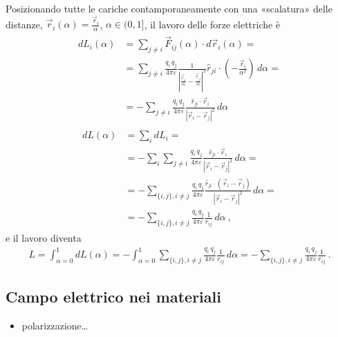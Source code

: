 \documentclass[letterpaper,10pt,italian]{jupyterBook}
\begin{document}
\sphinxAtStartPar
Posizionando tutte le cariche contamporaneamente con una «scalatura» delle distanze, \(\vec{r}_i(\alpha) = \frac{\vec{r}_i}{\alpha}\), \(\alpha \in (0, 1]\), il lavoro delle forze elettriche è
\begin{equation*}
\begin{split}\begin{aligned}
  dL_i(\alpha) & = \sum_{j \ne i} \vec{F}_{ij}(\alpha) \cdot d \vec{r}_i(\alpha) = \\
  & = \sum_{j \ne i} \frac{q_i \, q_j}{4 \pi \varepsilon}  \frac{1}{\left| \frac{\vec{r}_i}{\alpha} - \frac{\vec{r}_j}{\alpha}\right|^2} \hat{r}_{ji} \cdot \left(-\frac{\vec{r}_i}{\alpha^2}\right) \, d \alpha = \\
  & = - \sum_{j \ne i} \frac{q_i \, q_j}{4 \pi \varepsilon}  \frac{\hat{r}_{ji} \cdot\vec{r}_i}{\left| \vec{r}_i - \vec{r}_j\right|^2}  \, d \alpha
\end{aligned}\end{split}
\end{equation*}\begin{equation*}
\begin{split}\begin{aligned}
 dL(\alpha) & = \sum_i d L_i = \\
  & = - \sum_{i} \sum_{j \ne i} \frac{q_i \, q_j}{4 \pi \varepsilon}  \frac{\hat{r}_{ji} \cdot\vec{r}_i}{\left| \vec{r}_i - \vec{r}_j\right|^2}  \, d \alpha = \\
  & = - \sum_{\{i,j\}, i \ne j} \frac{q_i \, q_j}{4 \pi \varepsilon}  \frac{\hat{r}_{ji} \cdot \left( \vec{r}_i - \vec{r}_j \right)}{\left| \vec{r}_i - \vec{r}_j\right|^2}  \, d \alpha = \\
  & = - \sum_{\{i,j\}, i \ne j} \frac{q_i \, q_j}{4 \pi \varepsilon}  \frac{1}{r_{ij}}  \, d \alpha  \ ,
\end{aligned}\end{split}
\end{equation*}
\sphinxAtStartPar
e il lavoro diventa
\begin{equation*}
\begin{split}
 L = \int_{\alpha = 0}^{1} dL (\alpha) =  - \int_{\alpha=0}^{1} \sum_{\{i,j\}, i \ne j} \frac{q_i \, q_j}{4 \pi \varepsilon}  \frac{1}{r_{ij}}  \, d \alpha = - \sum_{\{i,j\}, i \ne j} \frac{q_i \, q_j}{4 \pi \varepsilon}  \frac{1}{r_{ij}} \ .
\end{split}
\end{equation*}

\subsection{Campo elettrico nei materiali}
\label{\detokenize{ch/electromagnetism/electrostatics:campo-elettrico-nei-materiali}}\label{\detokenize{ch/electromagnetism/electrostatics:physics-hs-electromagnetism-electrostatics-e-field-media}}\begin{itemize}
\item {} 
\sphinxAtStartPar
polarizzazione…

\end{itemize}
\end{document}
